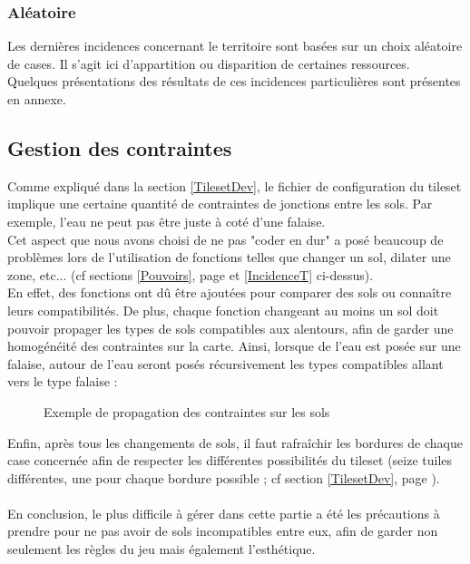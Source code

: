 \documentclass[a4paper]{memoir}
\begin{document}
				\subsubsection{Aléatoire}
					Les dernières incidences concernant le territoire sont basées sur un choix aléatoire de cases. Il s'agit ici d'appartition ou disparition de certaines ressources.\\
					Quelques présentations des résultats de ces incidences particulières sont présentes en annexe.\\
			
			\subsection{Gestion des contraintes}
				Comme expliqué dans la section \ref{TilesetDev}, le fichier de configuration du tileset implique une certaine quantité de contraintes de jonctions entre les sols. Par exemple, l'eau ne peut pas être juste à coté d'une falaise.\\
				Cet aspect que nous avons choisi de ne pas "coder en dur" a posé beaucoup de problèmes lors de l'utilisation de fonctions telles que changer un sol, dilater une zone, etc... (cf sections \ref{Pouvoirs}, page \pageref{Pouvoirs} et \ref{IncidenceT} ci-dessus).\\
				En effet, des fonctions ont dû être ajoutées pour comparer des sols ou connaître leurs compatibilités. De plus, chaque fonction changeant au moins un sol doit pouvoir propager les types de sols compatibles aux alentours, afin de garder une homogénéité des contraintes sur la carte. Ainsi, lorsque de l'eau est posée sur une falaise, autour de l'eau seront posés récursivement les types compatibles allant vers le type falaise :\\
				\begin{figure}[H]
					\begin{center}
					\end{center}
					\label{fig:spread}
					\caption{Exemple de propagation des contraintes sur les sols}
				\end{figure}
				Enfin, après tous les changements de sols, il faut rafraîchir les bordures de chaque case concernée afin de respecter les différentes possibilités du tileset (seize tuiles différentes, une pour chaque bordure possible ; cf section \ref{TilesetDev}, page \pageref{TilesetDev}).\\
				\\
				En conclusion, le plus difficile à gérer dans cette partie a été les précautions à prendre pour ne pas avoir de sols incompatibles entre eux, afin de garder non seulement les règles du jeu mais également l'esthétique.
\end{document}
